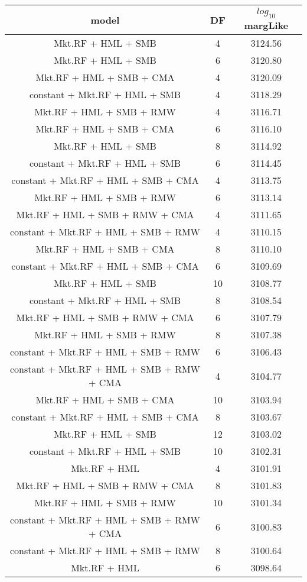 \begin{tabular}{ccc}
  \hline
model & DF & $log_{10}$ margLike \\ 
  \hline
Mkt.RF + HML + SMB & 4 & 3124.56 \\ 
  Mkt.RF + HML + SMB & 6 & 3120.80 \\ 
  Mkt.RF + HML + SMB + CMA & 4 & 3120.09 \\ 
  constant + Mkt.RF + HML + SMB & 4 & 3118.29 \\ 
  Mkt.RF + HML + SMB + RMW & 4 & 3116.71 \\ 
  Mkt.RF + HML + SMB + CMA & 6 & 3116.10 \\ 
  Mkt.RF + HML + SMB & 8 & 3114.92 \\ 
  constant + Mkt.RF + HML + SMB & 6 & 3114.45 \\ 
  constant + Mkt.RF + HML + SMB + CMA & 4 & 3113.75 \\ 
  Mkt.RF + HML + SMB + RMW & 6 & 3113.14 \\ 
  Mkt.RF + HML + SMB + RMW + CMA & 4 & 3111.65 \\ 
  constant + Mkt.RF + HML + SMB + RMW & 4 & 3110.15 \\ 
  Mkt.RF + HML + SMB + CMA & 8 & 3110.10 \\ 
  constant + Mkt.RF + HML + SMB + CMA & 6 & 3109.69 \\ 
  Mkt.RF + HML + SMB & 10 & 3108.77 \\ 
  constant + Mkt.RF + HML + SMB & 8 & 3108.54 \\ 
  Mkt.RF + HML + SMB + RMW + CMA & 6 & 3107.79 \\ 
  Mkt.RF + HML + SMB + RMW & 8 & 3107.38 \\ 
  constant + Mkt.RF + HML + SMB + RMW & 6 & 3106.43 \\ 
  constant + Mkt.RF + HML + SMB + RMW + CMA & 4 & 3104.77 \\ 
  Mkt.RF + HML + SMB + CMA & 10 & 3103.94 \\ 
  constant + Mkt.RF + HML + SMB + CMA & 8 & 3103.67 \\ 
  Mkt.RF + HML + SMB & 12 & 3103.02 \\ 
  constant + Mkt.RF + HML + SMB & 10 & 3102.31 \\ 
  Mkt.RF + HML & 4 & 3101.91 \\ 
  Mkt.RF + HML + SMB + RMW + CMA & 8 & 3101.83 \\ 
  Mkt.RF + HML + SMB + RMW & 10 & 3101.34 \\ 
  constant + Mkt.RF + HML + SMB + RMW + CMA & 6 & 3100.83 \\ 
  constant + Mkt.RF + HML + SMB + RMW & 8 & 3100.64 \\ 
  Mkt.RF + HML & 6 & 3098.64 \\ 
   \hline
\end{tabular}

